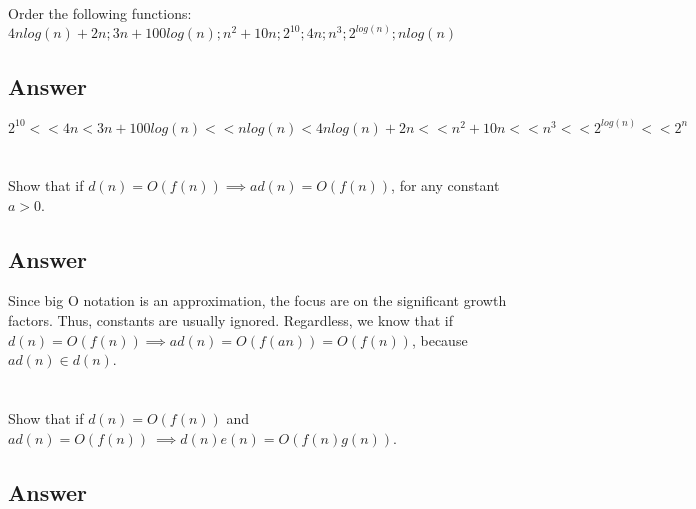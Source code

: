 \documentclass{article}
\begin{document}
\section{}

Order the following functions: \\ 

\(4nlog(n) + 2n; 3n + 100log(n); n^2 + 10n; 2^{10}; 4n; n^3; 2^{log(n)}; nlog(n)\)

\subsection{Answer}

\begin{mdframed}

\(2^{10} << 4n < 3n + 100log(n) << nlog(n) < 4nlog(n) + 2n << n^2 + 10n << n^3
  << 2^{log(n)} << 2^n \)

\end{mdframed}


\section{}

Show that if \(d(n) = O(f(n)) \implies ad(n) = O(f(n))\), for any constant
\(a > 0\).

\subsection{Answer}

\begin{mdframed}

  Since big O notation is an approximation, the focus are on the
  significant growth factors. Thus, constants are usually ignored. Regardless,
  we know that if \(d(n) =  O(f(n)) \implies ad(n) = O(f(an)) = O(f(n))\), because 
  \(ad(n) \in d(n)\).


\end{mdframed}


\section{}

Show that if \(d(n) = O(f(n))\) and \(ad(n) = O(f(n))\ \implies d(n)e(n) = O(f(n)g(n))\).

\subsection{Answer}
\end{document}
